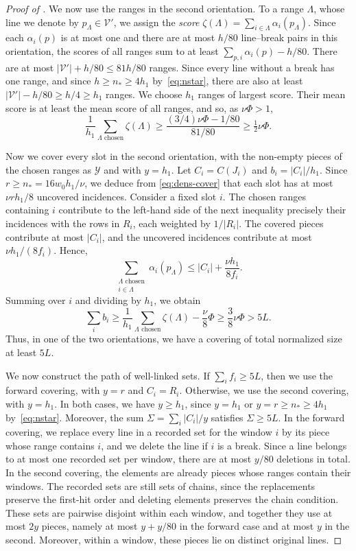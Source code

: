 \documentclass[fontsize=12pt,leading=14pt]{fullpaper}
\newcommand{\Vcal}{\mathcal{V}}
\newcommand{\Ycal}{\mathcal{Y}}
\begin{document}
\begin{proof}[Proof of ]
  We now use the ranges in the second orientation.
  To a range $\Lambda$, whose line we denote by $p_\Lambda\in\Vcal'$, we assign the \emph{score} $\zeta(\Lambda)=\sum_{i\in\Lambda}\alpha_i(p_\Lambda)$.
  Since each $\alpha_i(p)$ is at most one and there are at most $h/80$ line--break pairs in this orientation, the scores of all ranges sum to at least $\sum_{p,i}\alpha_i(p)-h/80$.
  There are at most $|\Vcal'|+h/80\le81h/80$ ranges.
  Since every line without a break has one range, and since $h\ge n_*\ge4h_1$ by~\eqref{eq:nstar}, there are also at least $|\Vcal'|-h/80\ge h/4\ge h_1$ ranges.
  We choose $h_1$ ranges of largest score.
  Their mean score is at least the mean score of all ranges, and so, as $\nu\Phi>1$,
  \[
    \frac1{h_1}\sum_{\Lambda\text{ chosen}}\zeta(\Lambda)
    \ge\frac{(3/4)\nu\Phi-1/80}{81/80}
    \ge\tfrac12\nu\Phi.
  \]

  Now we cover every slot in the second orientation, with the non-empty pieces of the chosen ranges as $\Ycal$ and with $y=h_1$.
  Let $C_i=C(J_i)$ and $b_i=|C_i|/h_1$.
  Since $r\ge n_*=16w_0h_1/\nu$, we deduce from \eqref{eq:dens-cover} that each slot has at most $\nu rh_1/8$ uncovered incidences.
  Consider a fixed slot $i$.
  The chosen ranges containing $i$ contribute to the left-hand side of the next inequality precisely their incidences with the rows in $R_i$, each weighted by $1/|R_i|$.
  The covered pieces contribute at most $|C_i|$, and the uncovered incidences contribute at most $\nu h_1/(8f_i)$.
  Hence,
  \[
    \sum_{\substack{\Lambda\text{ chosen}\\i\in\Lambda}}\alpha_i(p_\Lambda)
    \le |C_i|+\frac{\nu h_1}{8f_i}.
  \]
  Summing over $i$ and dividing by $h_1$, we obtain
  \[
    \sum_i b_i\ge\frac1{h_1}\sum_{\Lambda\text{ chosen}}\zeta(\Lambda)-\frac\nu8\Phi
    \ge\frac38\nu\Phi>5L.
  \]
  Thus, in one of the two orientations, we have a covering of total normalized size at least $5L$.

  We now construct the path of well-linked sets.
  If $\sum_i f_i\ge5L$, then we use the forward covering, with $y=r$ and $C_i=R_i$.
  Otherwise, we use the second covering, with $y=h_1$.
  In both cases, we have $y\ge h_1$, since $y=h_1$ or $y=r\ge n_*\ge4h_1$ by~\eqref{eq:nstar}.
  Moreover, the sum $\Sigma=\sum_i|C_i|/y$ satisfies $\Sigma\ge5L$.
  In the forward covering, we replace every line in a recorded set for the window $i$ by its piece whose range contains $i$, and we delete the line if $i$ is a break.
  Since a line belongs to at most one recorded set per window, there are at most $y/80$ deletions in total.
  In the second covering, the elements are already pieces whose ranges contain their windows.
  The recorded sets are still sets of chains, since the replacements preserve the first-hit order and deleting elements preserves the chain condition.
  These sets are pairwise disjoint within each window, and together they use at most $2y$ pieces, namely at most $y+y/80$ in the forward case and at most $y$ in the second.
  Moreover, within a window, these pieces lie on distinct original lines.


\end{proof}
\end{document}

